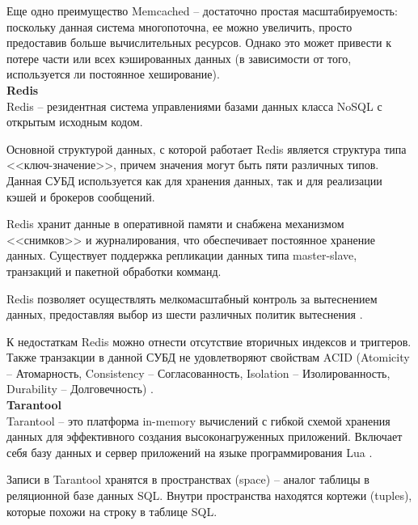 Еще одно преимущество Memcached -- достаточно простая масштабируемость: поскольку данная система многопоточна, ее можно увеличить, просто предоставив больше вычислительных ресурсов. Однако это может привести к потере части или всех кэшированных данных (в зависимости от того, используется ли постоянное хеширование). \\


\noindent\textbf{Redis}\\


Redis \cite{redis} -- резидентная система управлениями базами данных класса NoSQL с открытым исходным кодом. 

Основной структурой данных, с которой работает Redis является структура типа <<ключ-значение>>, причем значения могут быть пяти различных типов. Данная СУБД используется как для хранения данных, так и для реализации кэшей и брокеров сообщений.

Redis хранит данные в оперативной памяти и снабжена механизмом <<снимков>> и журналирования, что обеспечивает постоянное хранение данных. Существует поддержка репликации данных типа master-slave, транзакций и пакетной обработки комманд.

Redis позволяет осуществлять мелкомасштабный контроль за вытеснением данных, предоставляя выбор из шести различных политик вытеснения \cite{redis2}. 

К недостаткам Redis можно отнести отсутствие вторичных индексов и триггеров. Также транзакции в данной СУБД не удовлетворяют свойствам ACID (Atomicity -- Атомарность, Consistency -- Согласованность, Isolation -- Изолированность, Durability -- Долговечность) \cite{acid}.\\



\noindent\textbf{Tarantool}\\


Tarantool \cite{tarantool} -- это платформа in-memory вычислений с гибкой схемой хранения данных для эффективного создания высоконагруженных приложений. Включает себя базу данных и сервер приложений на языке программирования Lua \cite{lua}.

Записи в Tarantool хранятся в пространствах (space) -- аналог таблицы в реляционной базе данных SQL. Внутри пространства находятся кортежи (tuples), которые похожи на строку в таблице SQL. 


